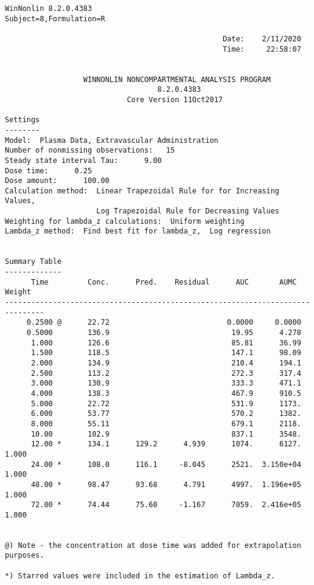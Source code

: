 \documentclass[12pt,a4paper]{article}
\begin{document}
\begin{verbatim}
WinNonlin 8.2.0.4383
Subject=8,Formulation=R

                                                  Date:    2/11/2020
                                                  Time:     22:58:07


                  WINNONLIN NONCOMPARTMENTAL ANALYSIS PROGRAM
                                   8.2.0.4383
                            Core Version 11Oct2017

Settings
--------
Model:  Plasma Data, Extravascular Administration
Number of nonmissing observations:   15
Steady state interval Tau:      9.00
Dose time:      0.25
Dose amount:      100.00
Calculation method:  Linear Trapezoidal Rule for for Increasing Values,
                     Log Trapezoidal Rule for Decreasing Values
Weighting for lambda_z calculations:  Uniform weighting
Lambda_z method:  Find best fit for lambda_z,  Log regression


Summary Table
-------------
      Time         Conc.      Pred.    Residual      AUC       AUMC      Weight
-------------------------------------------------------------------------------
     0.2500 @      22.72                           0.0000     0.0000
     0.5000        136.9                            19.95      4.278
      1.000        126.6                            85.81      36.99
      1.500        118.5                            147.1      98.09
      2.000        134.9                            210.4      194.1
      2.500        113.2                            272.3      317.4
      3.000        130.9                            333.3      471.1
      4.000        138.3                            467.9      910.5
      5.000        22.72                            531.9      1173.
      6.000        53.77                            570.2      1382.
      8.000        55.11                            679.1      2118.
      10.00        102.9                            837.1      3548.
      12.00 *      134.1      129.2      4.939      1074.      6127.      1.000
      24.00 *      108.0      116.1     -8.045      2521.  3.150e+04      1.000
      48.00 *      98.47      93.68      4.791      4997.  1.196e+05      1.000
      72.00 *      74.44      75.60     -1.167      7059.  2.416e+05      1.000


@) Note - the concentration at dose time was added for extrapolation purposes.

*) Starred values were included in the estimation of Lambda_z.



\end{verbatim}
\end{document}
